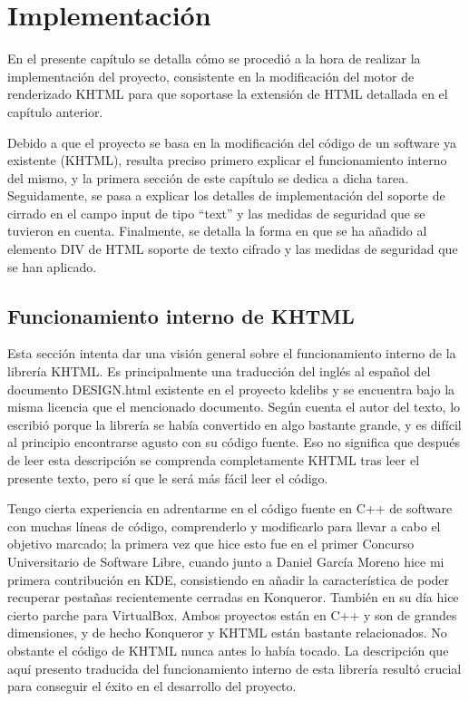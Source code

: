 \chapter{Implementación}\label{implementacion}

En el presente capítulo se detalla cómo se procedió a la hora de realizar la implementación del proyecto, consistente en la modificación del motor de renderizado KHTML para que soportase la extensión de HTML detallada en el capítulo anterior.

Debido a que el proyecto se basa en la modificación del código de un software ya existente (KHTML), resulta preciso primero explicar el funcionamiento interno del mismo, y la primera sección de este capítulo se dedica a dicha tarea. Seguidamente, se pasa a explicar los detalles de implementación del soporte de cirrado en el campo input de tipo ``text'' y las medidas de seguridad que se tuvieron en cuenta. Finalmente, se detalla la forma en que se ha añadido al elemento DIV de HTML soporte de texto cifrado y las medidas de seguridad que se han aplicado.

\section{Funcionamiento interno de KHTML}\label{khtml}

Esta sección intenta dar una visión general sobre el funcionamiento interno de la librería KHTML. Es principalmente una traducción del inglés al español del documento DESIGN.html existente en el proyecto kdelibs y se encuentra bajo la misma licencia que el mencionado documento. Según cuenta el autor del texto, lo escribió porque la librería se había convertido en algo bastante grande, y es difícil al principio encontrarse agusto con su código fuente. Eso no significa que después de leer esta descripción se comprenda completamente KHTML tras leer el presente texto, pero sí que le será más fácil leer el código. 

Tengo cierta experiencia en adrentarme en el código fuente en C++ de software con muchas líneas de código, comprenderlo y modificarlo para llevar a cabo el objetivo marcado; la primera vez que hice esto fue en el primer Concurso Universitario de Software Libre, cuando junto a Daniel García Moreno hice mi primera contribución en KDE, consistiendo en añadir la característica de poder recuperar pestañas recientemente cerradas en Konqueror. También en su día hice cierto parche para VirtualBox. Ambos proyectos están en C++ y son de grandes dimensiones, y de hecho Konqueror y KHTML están bastante relacionados. No obstante el código de KHTML nunca antes lo había tocado. La descripción que aquí presento traducida del funcionamiento interno de esta librería resultó crucial para conseguir el éxito en el desarrollo del proyecto. 

